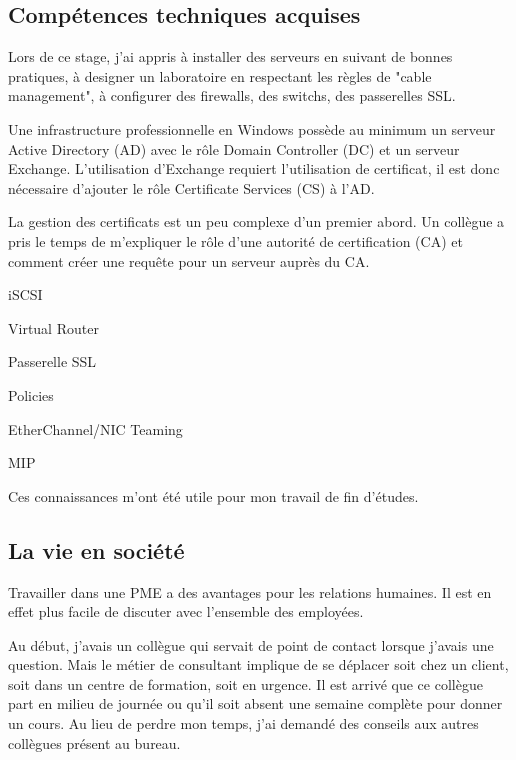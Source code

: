 \subsection{Compétences techniques acquises}
Lors de ce stage, j'ai appris à installer des serveurs en suivant de bonnes pratiques, à designer un laboratoire en respectant les règles de "cable management", à configurer des firewalls, des switchs, des passerelles SSL. 

Une infrastructure professionnelle en Windows possède au minimum un serveur Active Directory (AD) avec le rôle Domain Controller (DC) et un serveur Exchange. 
L'utilisation d'Exchange requiert l'utilisation de certificat, il est donc nécessaire d'ajouter le rôle Certificate Services (CS) à l'AD.

La gestion des certificats est un peu complexe d'un premier abord.
Un collègue a pris le temps de m'expliquer le rôle d'une autorité de certification (CA) et comment créer une requête pour un serveur auprès du CA. 

iSCSI

Virtual Router

Passerelle SSL 

Policies

EtherChannel/NIC Teaming

MIP


Ces connaissances m'ont été utile pour mon travail de fin d'études. 
\subsection{La vie en société}
Travailler dans une PME a des avantages pour les relations humaines.
Il est en effet plus facile de discuter avec l'ensemble des employées.

Au début, j'avais un collègue qui servait de point de contact lorsque j'avais une question.
Mais le métier de consultant implique de se déplacer soit chez un client, soit dans un centre de formation, soit en urgence.
Il est arrivé que ce collègue part en milieu de journée ou qu'il soit absent une semaine complète pour donner un cours.
Au lieu de perdre mon temps, j'ai demandé des conseils aux autres collègues présent au bureau. 

